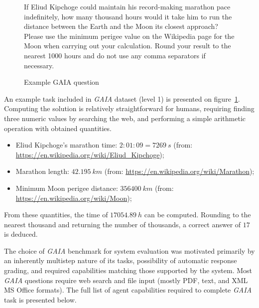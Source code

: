 \documentclass[a4paper,11pt,twoside]{report}
\theoremstyle{definition}
\begin{document}
\begin{figure}[htbp]
    \begin{framed}
        If Eliud Kipchoge could maintain his record-making marathon pace indefinitely, how many thousand hours would it take him to run the distance between the Earth and the Moon its closest approach? Please use the minimum perigee value on the Wikipedia page for the Moon when carrying out your calculation. Round your result to the nearest 1000 hours and do not use any comma separators if necessary.
    \end{framed}
    \caption{Example GAIA question}
    \label{figure:example-gaia-question}
\end{figure}

An example task included in \textit{GAIA} dataset (level 1) is presented on figure~\ref{figure:example-gaia-question}. Computing the solution is relatively straightforward for humans, requiring finding three numeric values by searching the web, and performing a simple arithmetic operation with obtained quantities.

\begin{itemize}
    \item Eliud Kipchoge's marathon time: $2:01:09 = 7269~s$ (from: \url{https://en.wikipedia.org/wiki/Eliud_Kipchoge});
    \item Marathon length: $42.195~km$ (from: \url{https://en.wikipedia.org/wiki/Marathon});
    \item Minimum Moon perigee distance: $356400~km$ (from: \url{https://en.wikipedia.org/wiki/Moon});
\end{itemize}

From these quantities, the time of $17054.89~h$ can be computed. Rounding to the nearest thousand and returning the number of thousands, a correct answer of $17$ is deduced.

The choice of \textit{GAIA} benchmark for system evaluation was motivated primarily by an inherently multistep nature of its tasks, possibility of automatic response grading, and required capabilities matching those supported by the system. Most \textit{GAIA} questions require web search and file input (mostly PDF, text, and XML MS Office formats). The full list of agent capabilities required to complete \textit{GAIA} task is presented below.
\end{document}
